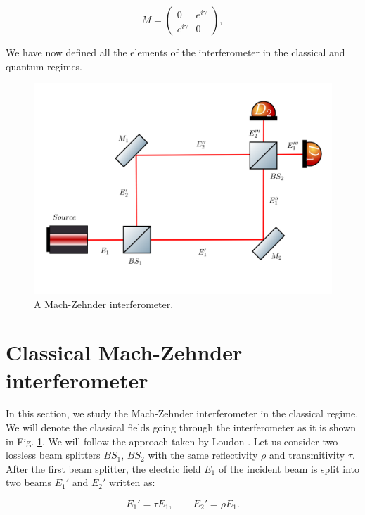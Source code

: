 \documentclass[12pt]{book}
\begin{document}
 
\begin{equation}
M=\begin{pmatrix} 0& e^{i\gamma}  \\ e^{i\gamma} & 0 \end{pmatrix}, \label{mirror}
\end{equation}


 We have now defined all the elements of the interferometer in the classical and quantum regimes.

\begin{figure}[H]
\centering
\includegraphics[width=\linewidth]{images/machzenhdercla.png}
\caption{A Mach-Zehnder interferometer.}
\label{fig:classical mach}
\end{figure}



\section{Classical Mach-Zehnder interferometer}

In this section, we study the Mach-Zehnder interferometer in the classical regime. We will denote the classical fields going through the interferometer as it is shown in Fig. \ref{fig:classical mach}. We will follow the approach taken by Loudon \cite{ludon}. Let us consider two lossless beam splitters   $BS_{1}$, $BS_{2}$ with the same reflectivity $\rho$ and transmitivity $\tau$. After the first beam splitter, the electric field $E_{1}$ of the incident beam is split into two beams $E_{1}'$ and $E_{2}'$ written as:

\begin{equation}
E_{1}'=\tau E_{1} ,\qquad E_{2}'=\rho E_{1}.\label{corr1}
\end{equation}
\end{document}
